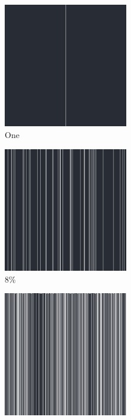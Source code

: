 \documentclass[12pt, fleqn]{report}                             %
\theoremstyle{break}                                            %
\begin{document}
      \begin{figure}[ht!]
        \centering
        \begin{subfigure}[b]{0.4\linewidth}
          \includegraphics[width=0.6\textwidth]{Images/108/a.png}
          \caption{One}
        \end{subfigure}
        \begin{subfigure}[b]{0.4\linewidth}
          \includegraphics[width=0.6\textwidth]{Images/108/b.png}
          \caption{8\%}
        \end{subfigure}
        \begin{subfigure}[b]{0.4\linewidth}
          \includegraphics[width=0.6\textwidth]{Images/108/c.png}

\end{subfigure}
\end{figure}
\end{document}
